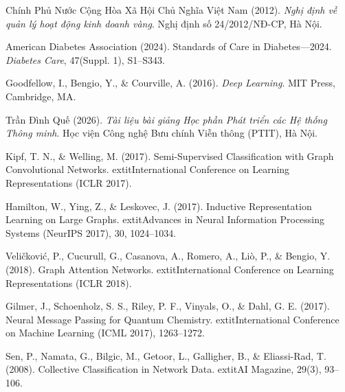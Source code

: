 \documentclass[12pt,a4paper]{report}
\begin{document}
\begin{enumerate}[leftmargin=1.5cm, label={[\arabic*]}]
    \item Chính Phủ Nước Cộng Hòa Xã Hội Chủ Nghĩa Việt Nam (2012). \textit{Nghị định về quản lý hoạt động kinh doanh vàng}. Nghị định số 24/2012/NĐ-CP, Hà Nội.
    \item American Diabetes Association (2024). Standards of Care in Diabetes—2024. \textit{Diabetes Care}, 47(Suppl. 1), S1--S343.
    \item Goodfellow, I., Bengio, Y., \& Courville, A. (2016). \textit{Deep Learning}. MIT Press, Cambridge, MA.
    \item Trần Đình Quế (2026). \textit{Tài liệu bài giảng Học phần Phát triển các Hệ thống Thông minh}. Học viện Công nghệ Bưu chính Viễn thông (PTIT), Hà Nội.
    \item Kipf, T. N., \& Welling, M. (2017). Semi-Supervised Classification with Graph Convolutional Networks. 	extit{International Conference on Learning Representations (ICLR 2017)}.
    \item Hamilton, W., Ying, Z., \& Leskovec, J. (2017). Inductive Representation Learning on Large Graphs. 	extit{Advances in Neural Information Processing Systems (NeurIPS 2017)}, 30, 1024--1034.
    \item Veličković, P., Cucurull, G., Casanova, A., Romero, A., Liò, P., \& Bengio, Y. (2018). Graph Attention Networks. 	extit{International Conference on Learning Representations (ICLR 2018)}.
    \item Gilmer, J., Schoenholz, S. S., Riley, P. F., Vinyals, O., \& Dahl, G. E. (2017). Neural Message Passing for Quantum Chemistry. 	extit{International Conference on Machine Learning (ICML 2017)}, 1263--1272.
    \item Sen, P., Namata, G., Bilgic, M., Getoor, L., Galligher, B., \& Eliassi-Rad, T. (2008). Collective Classification in Network Data. 	extit{AI Magazine}, 29(3), 93--106.
\end{enumerate}
\end{document}
